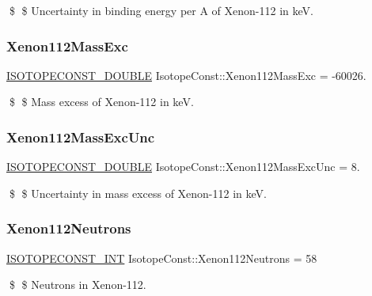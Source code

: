 \$ \$ Uncertainty in binding energy per A of Xenon-\/112 in keV. \mbox{\label{group___isotope_const-_xenon-_xe112_ga1de0dea82b331cdd550757aff47f3e52}} 
\subsubsection{\texorpdfstring{Xenon112\+Mass\+Exc}{Xenon112MassExc}}
{\footnotesize\ttfamily \mbox{\hyperlink{group___isotope_const-_macros_ga8f45a7272ce02c0b4c65c44636ed719a}{I\+S\+O\+T\+O\+P\+E\+C\+O\+N\+S\+T\+\_\+\+D\+O\+U\+B\+LE}} Isotope\+Const\+::\+Xenon112\+Mass\+Exc = -\/60026.}

\$ \$ Mass excess of Xenon-\/112 in keV. \mbox{\label{group___isotope_const-_xenon-_xe112_ga24ba7ca14960ffa290ad672bcf22f548}} 
\subsubsection{\texorpdfstring{Xenon112\+Mass\+Exc\+Unc}{Xenon112MassExcUnc}}
{\footnotesize\ttfamily \mbox{\hyperlink{group___isotope_const-_macros_ga8f45a7272ce02c0b4c65c44636ed719a}{I\+S\+O\+T\+O\+P\+E\+C\+O\+N\+S\+T\+\_\+\+D\+O\+U\+B\+LE}} Isotope\+Const\+::\+Xenon112\+Mass\+Exc\+Unc = 8.}

\$ \$ Uncertainty in mass excess of Xenon-\/112 in keV. \mbox{\label{group___isotope_const-_xenon-_xe112_ga641237e20d04b73e66b5c101958ef277}} 
\subsubsection{\texorpdfstring{Xenon112\+Neutrons}{Xenon112Neutrons}}
{\footnotesize\ttfamily \mbox{\hyperlink{group___isotope_const-_macros_ga5f18360b3e99483a35c32d789e62621c}{I\+S\+O\+T\+O\+P\+E\+C\+O\+N\+S\+T\+\_\+\+I\+NT}} Isotope\+Const\+::\+Xenon112\+Neutrons = 58}

\$ \$ Neutrons in Xenon-\/112. \mbox{\label{group___isotope_const-_xenon-_xe112_ga0d504c1433a70898c331423539c2b537}} 

